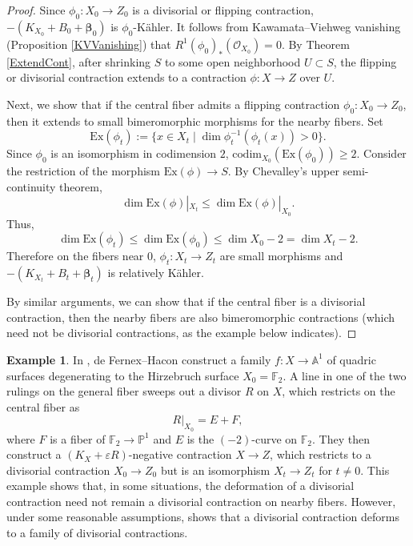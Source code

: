 \documentclass[12pt]{amsart}
\numberwithin{equation}{section}
\theoremstyle{definition}
\newtheorem{example}  [theorem]     {Example}
\theoremstyle{plain}
\newtheorem*{thm A*}{Theorem A}
\newtheorem*{thm B*}{Theorem B}
\newtheorem*{thm C*}{Theorem C}
\newtheorem*{thm D*}{Theorem D}
\theoremstyle{definition}
\renewcommand{\1}{\mathds{1}}
\newcommand{\bbeta}{\boldsymbol{\beta}}
\renewcommand{\>}{\rightarrow}
\begin{document}
\begin{proof}
Since $\phi_0 :X_0 \to Z_0$ is a divisorial or flipping contraction, 
$- (K_{X_0} + B_0 +  {{\bbeta}}_0)$ is $\phi_0$-K\"ahler. It follows from Kawamata--Viehweg vanishing (Proposition \ref{KVVanishing}) that 
$R^1 (\phi_0)_*(\mathcal{O}_{X_0}) = 0$. By Theorem \ref{ExtendCont}, after shrinking $S$ to some open neighborhood $U\subset S$, the flipping or divisorial contraction extends to a contraction 
$\phi : X \to Z$ over $U$.

Next, we show that if the central fiber admits a flipping contraction $\phi_0:X_0 \to Z_0$, then it extends to small bimeromorphic morphisms for the nearby fibers. Set
\[
\mathrm{Ex}(\phi_t) := \{ x \in X_t \mid \dim \phi_t^{-1}(\phi_t(x)) > 0 \}.
\]
Since $\phi_0$ is an isomorphism in codimension $2$, 
$\mathrm{codim}_{X_0}(\mathrm{Ex}(\phi_0)) \ge 2$. Consider the restriction of the morphism 
$\mathrm{Ex}(\phi) \to S$. By Chevalley’s upper semi-continuity theorem,
\[
\dim \mathrm{Ex}(\phi)|_{X_t} \le \dim \mathrm{Ex}(\phi)|_{X_0}.
\]
Thus,
\[
\dim \mathrm{Ex}(\phi_t) \le \dim \mathrm{Ex}(\phi_0) \le \dim X_0 - 2 = \dim X_t - 2.
\]
Therefore on the fibers near $0$, $\phi_t : X_t \to Z_t$ are small morphisms and $-(K_{X_t}+B_t+\boldsymbol{\beta} _t)$ is relatively K\"ahler. 

By similar arguments, we can show that if the central fiber is a divisorial contraction, then the nearby fibers are also bimeromorphic contractions (which need not be divisorial contractions, as the example below indicates).
\end{proof}
\begin{example}
In \cite[Remark 4.5]{FH11}, de Fernex--Hacon construct a family 
$ f: X \to \mathbb{A}^1 $ of quadric surfaces degenerating to the Hirzebruch surface 
$ X_0 = \mathbb{F}_2 $. A line in one of the two rulings on the general fiber sweeps out a divisor 
$ R $ on $ X $, which restricts on the central fiber as  
\[
R|_{X_0} = E + F,
\]
where $ F $ is a fiber of $ \mathbb{F}_2 \to \mathbb{P}^1 $ and $ E $ is the $(-2)$-curve on $ \mathbb{F}_2 $. They then construct a $(K_X + \varepsilon R)$-negative contraction $ X \to Z $, which restricts to a divisorial contraction $ X_0 \to Z_0 $ but is an isomorphism 
$ X_t \to Z_t $ for $ t \neq 0 $. This example shows that, in some situations, the deformation of a divisorial contraction need not remain a divisorial contraction on nearby fibers. However, under some reasonable assumptions, \cite[Theorem 5.7]{FH11} shows that a divisorial contraction deforms to a family of divisorial contractions. 
\end{example}
\end{document}
